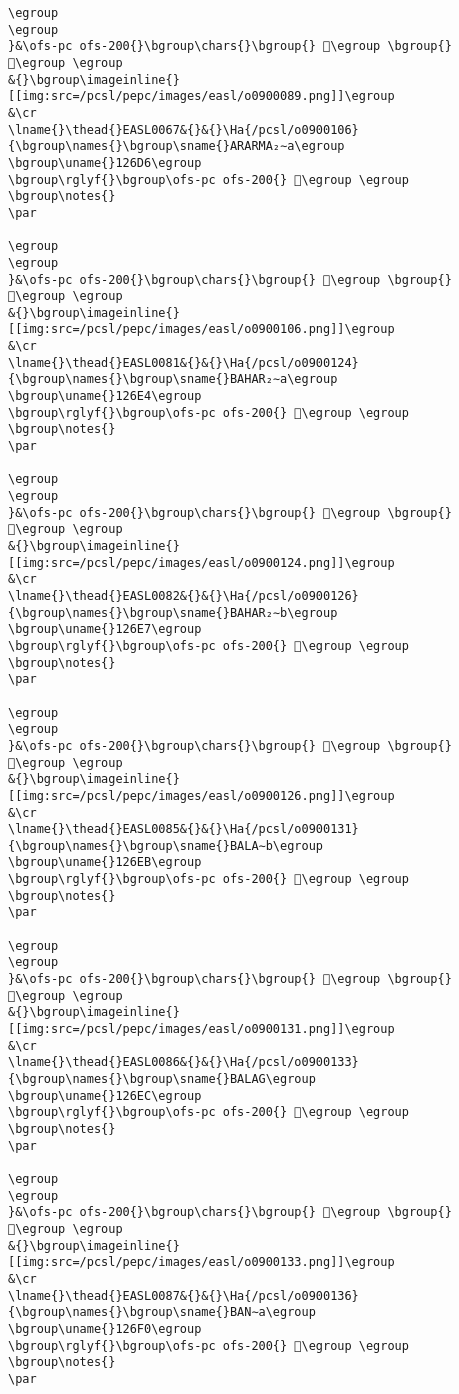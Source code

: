 \begin{verbatim}
\egroup
\egroup
}&\ofs-pc ofs-200{}\bgroup\chars{}\bgroup{} 𒛍\egroup \bgroup{} 𒛌\egroup \egroup
&{}\bgroup\imageinline{}[[img:src=/pcsl/pepc/images/easl/o0900089.png]]\egroup
&\cr
\lname{}\thead{}EASL0067&{}&{}\Ha{/pcsl/o0900106}{\bgroup\names{}\bgroup\sname{}ARARMA₂∼a\egroup
\bgroup\uname{}126D6\egroup
\bgroup\rglyf{}\bgroup\ofs-pc ofs-200{} 𒛖\egroup \egroup
\bgroup\notes{}
\par 

\egroup
\egroup
}&\ofs-pc ofs-200{}\bgroup\chars{}\bgroup{} 𒛗\egroup \bgroup{} 𒛖\egroup \egroup
&{}\bgroup\imageinline{}[[img:src=/pcsl/pepc/images/easl/o0900106.png]]\egroup
&\cr
\lname{}\thead{}EASL0081&{}&{}\Ha{/pcsl/o0900124}{\bgroup\names{}\bgroup\sname{}BAHAR₂∼a\egroup
\bgroup\uname{}126E4\egroup
\bgroup\rglyf{}\bgroup\ofs-pc ofs-200{} 𒛤\egroup \egroup
\bgroup\notes{}
\par 

\egroup
\egroup
}&\ofs-pc ofs-200{}\bgroup\chars{}\bgroup{} 𒛤\egroup \bgroup{} 𒛥\egroup \egroup
&{}\bgroup\imageinline{}[[img:src=/pcsl/pepc/images/easl/o0900124.png]]\egroup
&\cr
\lname{}\thead{}EASL0082&{}&{}\Ha{/pcsl/o0900126}{\bgroup\names{}\bgroup\sname{}BAHAR₂∼b\egroup
\bgroup\uname{}126E7\egroup
\bgroup\rglyf{}\bgroup\ofs-pc ofs-200{} 𒛧\egroup \egroup
\bgroup\notes{}
\par 

\egroup
\egroup
}&\ofs-pc ofs-200{}\bgroup\chars{}\bgroup{} 𒛦\egroup \bgroup{} 𒛧\egroup \egroup
&{}\bgroup\imageinline{}[[img:src=/pcsl/pepc/images/easl/o0900126.png]]\egroup
&\cr
\lname{}\thead{}EASL0085&{}&{}\Ha{/pcsl/o0900131}{\bgroup\names{}\bgroup\sname{}BALA∼b\egroup
\bgroup\uname{}126EB\egroup
\bgroup\rglyf{}\bgroup\ofs-pc ofs-200{} 𒛫\egroup \egroup
\bgroup\notes{}
\par 

\egroup
\egroup
}&\ofs-pc ofs-200{}\bgroup\chars{}\bgroup{} 𒛪\egroup \bgroup{} 𒛫\egroup \egroup
&{}\bgroup\imageinline{}[[img:src=/pcsl/pepc/images/easl/o0900131.png]]\egroup
&\cr
\lname{}\thead{}EASL0086&{}&{}\Ha{/pcsl/o0900133}{\bgroup\names{}\bgroup\sname{}BALAG\egroup
\bgroup\uname{}126EC\egroup
\bgroup\rglyf{}\bgroup\ofs-pc ofs-200{} 𒛬\egroup \egroup
\bgroup\notes{}
\par 

\egroup
\egroup
}&\ofs-pc ofs-200{}\bgroup\chars{}\bgroup{} 𒛬\egroup \bgroup{} 𒛭\egroup \egroup
&{}\bgroup\imageinline{}[[img:src=/pcsl/pepc/images/easl/o0900133.png]]\egroup
&\cr
\lname{}\thead{}EASL0087&{}&{}\Ha{/pcsl/o0900136}{\bgroup\names{}\bgroup\sname{}BAN∼a\egroup
\bgroup\uname{}126F0\egroup
\bgroup\rglyf{}\bgroup\ofs-pc ofs-200{} 𒛰\egroup \egroup
\bgroup\notes{}
\par 


\end{verbatim}
